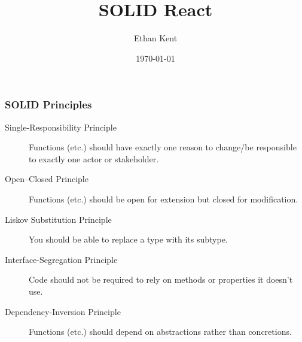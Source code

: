 \documentclass[aspectratio=169]{beamer}
\title{SOLID React}
\author{Ethan Kent}
\institute{Spoonflower}
\date{\today}
\begin{document}
\frame{\titlepage}

\begin{frame}

  \frametitle{SOLID Principles}

  \begin{description}
    \item[Single-Responsibility Principle] Functions (etc.) should have exactly
      one reason to change/be responsible to exactly one actor or stakeholder.
    \item[Open--Closed Principle] Functions (etc.) should be open for extension
      but closed for modification.
    \item[Liskov Substitution Principle] You should be able to replace a type
      with its subtype.
    \item[Interface-Segregation Principle] Code should not be required to rely
      on methods or properties it doesn't use.
    \item[Dependency-Inversion Principle] Functions (etc.) should depend on
      abstractions rather than concretions.
  \end{description}

\end{frame}
\end{document}

